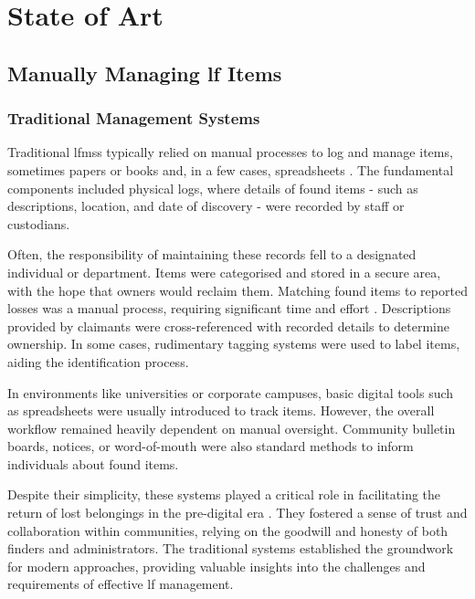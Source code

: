 \chapter{State of Art}
\label{chapter:state_of_art}

\section{Manually Managing \acl{lf} Items} \label{sec:manually-managing-lf-items}

\subsection{Traditional Management Systems} \label{subsec:traditional-lf-systems}

Traditional \acp{lfms} typically relied on manual processes to log and manage items, sometimes papers or books and, in a few cases, spreadsheets \cite{Anas2023}. The fundamental components included physical logs, where details of found items - such as descriptions, location, and date of discovery - were recorded by staff or custodians.

Often, the responsibility of maintaining these records fell to a designated individual or department. Items were categorised and stored in a secure area, with the hope that owners would reclaim them. Matching found items to reported losses was a manual process, requiring significant time and effort \cite{Anas2023}. Descriptions provided by claimants were cross-referenced with recorded details to determine ownership. In some cases, rudimentary tagging systems were used to label items, aiding the identification process.

In environments like universities or corporate campuses, basic digital tools such as spreadsheets were usually introduced to track items. However, the overall workflow remained heavily dependent on manual oversight. Community bulletin boards, notices, or word-of-mouth were also standard methods to inform individuals about found items.

Despite their simplicity, these systems played a critical role in facilitating the return of lost belongings in the pre-digital era \cite{Mayura2024}. They fostered a sense of trust and collaboration within communities, relying on the goodwill and honesty of both finders and administrators. The traditional systems established the groundwork for modern approaches, providing valuable insights into the challenges and requirements of effective \ac{lf} management.

